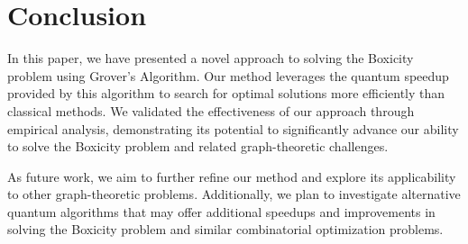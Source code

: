 \section{Conclusion} \label{sec:conclusion}
In this paper, we have presented a novel approach to solving the Boxicity problem using Grover's Algorithm. Our method leverages the quantum speedup provided by this algorithm to search for optimal solutions more efficiently than classical methods. We validated the effectiveness of our approach through empirical analysis, demonstrating its potential to significantly advance our ability to solve the Boxicity problem and related graph-theoretic challenges.

As future work, we aim to further refine our method and explore its applicability to other graph-theoretic problems. Additionally, we plan to investigate alternative quantum algorithms that may offer additional speedups and improvements in solving the Boxicity problem and similar combinatorial optimization problems.

